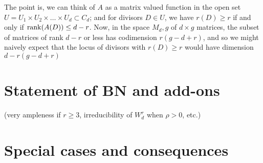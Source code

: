 The point is, we can think of $A$ as a matrix valued function in the open set $U = U_1 \times U_2 \times \dots \times U_d \subset C_d$; and for divisors $D \in U$, we have $r(D) \geq r$ if and only if $\rank(A(D)) \leq d-r$. Now, in the space $M_d,g$ of $d \times g$ matrices, the subset of matrices of rank $d-r$ or less has codimension $r(g-d+r)$, and so we might naively expect that the locus of divisors with $r(D) \geq r$ would have dimension $d - r(g-d+r)$

\section{Statement of BN and add-ons}

 (very ampleness if $r \geq 3$, irreducibility of $W^r_d$ when $\rho > 0$, etc.)

\section{Special cases and consequences}


